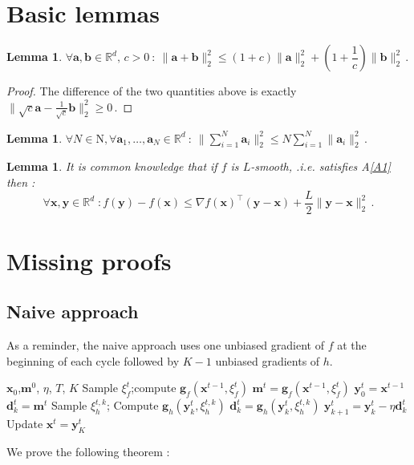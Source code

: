 \documentclass[10pt]{article} %
\theoremstyle{plain}
\newtheorem{lemma}[theorem]{Lemma}
\theoremstyle{definition}
\theoremstyle{remark}
\newcommand{\norm}[1]{\|#1\|_2}
\def\va{{\bm{a}}}
\def\vb{{\bm{b}}}
\def\vd{{\bm{d}}}
\def\vg{{\bm{g}}}
\def\vm{{\bm{m}}}
\def\vx{{\bm{x}}}
\def\vy{{\bm{y}}}
\newcommand{\R}{\mathbb{R}}
\begin{document}
\section{Basic lemmas}
\begin{lemma}\label{A.1}
$\forall \va,\vb\in\R^d,\, c>0\: :\:\norm{\va + \vb}^2 \leq (1+c) \norm{\va}^2 + (1+\dfrac{1}{c}) \norm{\vb}^2\, .$
\end{lemma}
\begin{proof}
The difference of the two quantities above is exactly $\norm{\sqrt{c}\va - \frac{1}{\sqrt{c}}\vb}^2\geq 0\, .$
\end{proof}
\begin{lemma}\label{A.2}
$\forall N\in\mathrm{N}, \forall \va_1,\ldots,\va_N\in\R^d\: :\:\norm{\sum_{i=1}^N\va_i}^2 \leq N \sum_{i=1}^N\norm{\va_i}^2\, .$
\end{lemma}
\begin{lemma}
It is common knowledge that if $f$ is $L$-smooth, .i.e. satisfies A\ref{A1} then :$$\forall \vx,\vy\in \R^d \; : f(\vy) - f(\vx)\leq \nabla f(\vx)^\top (\vy - \vx) + \frac{L}{2} \norm{\vy - \vx}^2\, .$$
\end{lemma}

\section{Missing proofs}
\subsection{Naive approach}\label{NA} As a reminder, the naive approach uses one unbiased gradient of $f$ at the beginning of each cycle followed by $K-1$ unbiased gradients of $h$. 
\begin{algorithm}[h]
\begin{algorithmic}
\REQUIRE $\vx_0$,$\vm^0$, $\eta$, $T$, $K$
\STATE  Sample $\xi^t_f$;\:compute $\vg_f(\vx^{t-1},\xi^t_f)$
\STATE $\vm^t = \vg_f(\vx^{t-1},\xi^t_f)$
\STATE $\vy^t_0 = \vx^{t-1}$
\STATE $\vd^t_k = \vm^t$
\ELSE
\STATE Sample $\xi^{t,k}_h$;\: Compute $\vg_h(\vy^{t}_k,\xi^{t,k}_h)$
\STATE $\vd^t_k = \vg_h(\vy^{t}_k,\xi^{t,k}_h)$
\ENDIF
\STATE $\vy^t_{k+1} = \vy^t_{k} - \eta \vd^t_k$
\ENDFOR
\STATE Update $\vx^t  = \vy^t_{K}$
\ENDFOR
\end{algorithmic}
\caption{Naive$(f,h)$} 
\label{alg:Naive}
\end{algorithm}



We prove the following theorem :
\end{document}
